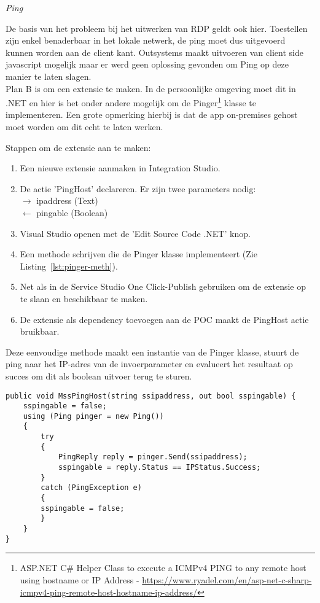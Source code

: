 \textit{Ping}

De basis van het probleem bij het uitwerken van RDP geldt ook hier. Toestellen zijn enkel benaderbaar in het lokale netwerk, de ping moet dus uitgevoerd kunnen worden aan de client kant. Outsystems maakt uitvoeren van client side javascript mogelijk maar er werd geen oplossing gevonden om Ping op deze manier te laten slagen.\\
Plan B is om een extensie te maken. In de persoonlijke omgeving moet dit in .NET en hier is het onder andere mogelijk om de Pinger\footnote{ASP.NET C\# Helper Class to execute a ICMPv4 PING to any remote host using hostname or IP Address - \url{https://www.ryadel.com/en/asp-net-c-sharp-icmpv4-ping-remote-host-hostname-ip-address/}} klasse te implementeren. Een grote opmerking hierbij is dat de app on-premises gehost moet worden om dit echt te laten werken.

Stappen om de extensie aan te maken:
\begin{enumerate}
    \item Een nieuwe extensie aanmaken in Integration Studio.
    \item De actie 'PingHost' declareren. Er zijn twee parameters nodig:\\
    $\rightarrow$ ipaddress (Text)\\
    $\leftarrow$ pingable (Boolean)
    \item Visual Studio openen met de 'Edit Source Code .NET' knop.
    \item Een methode schrijven die de Pinger klasse implementeert (Zie Listing~\ref{lst:pinger-meth}). 
    \item Net als in de Service Studio One Click-Publish gebruiken om de extensie op te slaan en beschikbaar te maken.
    \item De extensie als dependency toevoegen aan de POC maakt de PingHost actie bruikbaar.
\end{enumerate}

Deze eenvoudige methode maakt een instantie van de Pinger klasse, stuurt de ping naar het IP-adres van de invoerparameter en evalueert het resultaat op succes om dit als boolean uitvoer terug te sturen. 
\begin{lstlisting}[style=CSharpStyle,label={lst:pinger-meth},caption={Pinger implementatie},captionpos=b]
public void MssPingHost(string ssipaddress, out bool sspingable) {
    sspingable = false;
    using (Ping pinger = new Ping())
    {
        try
        {
            PingReply reply = pinger.Send(ssipaddress);
            sspingable = reply.Status == IPStatus.Success;
        }
        catch (PingException e)
        {
        sspingable = false;
        }
    }
}
\end{lstlisting}

